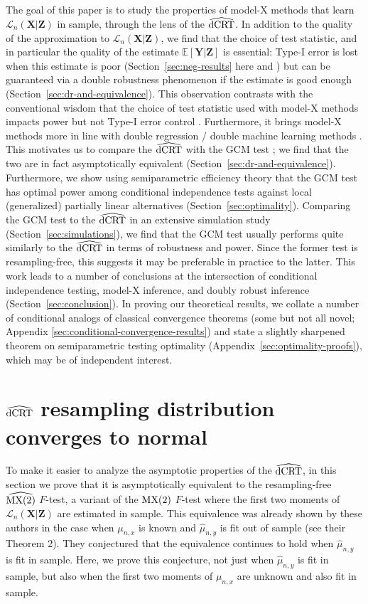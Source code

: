 \documentclass[12pt]{article}
\theoremstyle{definition}
\theoremstyle{remark}
\newcommand{\E}{\mathbb E}								%
\newcommand{\prx}{\bm X}								%
\newcommand{\prz}{\bm Z}								%
\newcommand{\pry}{{\bm Y}}								%
\newcommand{\law}{\mathcal L}							%
\newcommand{\dCRThat}{\widehat{\textnormal{dCRT}}}		%
\newcommand{\MXtwohat}{\widehat{\textnormal{MX(2)}}}		%
\newcommand{\MXtwo}{\textnormal{MX(2)}}                 %
\begin{document}
	The goal of this paper is to study the properties of model-X methods that learn $\law_n(\prx|\prz)$ in sample, through the lens of the $\dCRThat$. In addition to the quality of the approximation to $\law_n(\prx|\prz)$, we find that the choice of test statistic, and in particular the quality of the estimate $\E[\pry|\prz]$ is essential: Type-I error is lost when this estimate is poor (Section~\ref{sec:neg-results} here and \cite{Li2022}) but can be guaranteed via a double robustness phenomenon if the estimate is good enough (Section~\ref{sec:dr-and-equivalence}). This observation contrasts with the conventional wisdom that the choice of test statistic used with model-X methods impacts power \citep{Katsevich2020a} but not Type-I error control \citep{CetL16}. Furthermore, it brings model-X methods more in line with double regression / double machine learning methods \citep{Shah2018, Chernozhukov2018}. This motivates us to compare the $\dCRThat$ with the GCM test \citep{Shah2018}; we find that the two are in fact asymptotically equivalent (Section~\ref{sec:dr-and-equivalence}). Furthermore, we show using semiparametric efficiency theory that the GCM test has optimal power among conditional independence tests against local (generalized) partially linear alternatives (Section~\ref{sec:optimality}). Comparing the GCM test to the $\dCRThat$ in an extensive simulation study (Section~\ref{sec:simulations}), we find that the GCM test usually performs quite similarly to the $\dCRThat$ in terms of robustness and power. Since the former test is resampling-free, this suggests it may be preferable in practice to the latter. This work leads to a number of conclusions at the intersection of conditional independence testing, model-X inference, and doubly robust inference (Section~\ref{sec:conclusion}). In proving our theoretical results, we collate a number of conditional analogs of classical convergence theorems (some but not all novel; Appendix \ref{sec:conditional-convergence-results}) and state a slightly sharpened theorem on semiparametric testing optimality (Appendix~\ref{sec:optimality-proofs}), which may be of independent interest.
	
	\section{$\dCRThat$ resampling distribution converges to normal} \label{sec:conv-to-normal}
	
	To make it easier to analyze the asymptotic properties of the $\dCRThat$, in this section we prove that it is asymptotically equivalent to the resampling-free $\MXtwohat$ $F$-test, a variant of the $\MXtwo$ $F$-test \citep{Katsevich2020a} where the first two moments of $\law_n(\prx|\prz)$ are estimated in sample. This equivalence was already shown by these authors in the case when $\mu_{n,x}$ is known and $\widehat \mu_{n,y}$ is fit out of sample (see their Theorem 2). They conjectured that the equivalence continues to hold when $\widehat \mu_{n,y}$ is fit in sample. Here, we prove this conjecture, not just when $\widehat \mu_{n,y}$ is fit in sample, but also when the first two moments of $\mu_{n,x}$ are unknown and also fit in sample.
	
\end{document}

